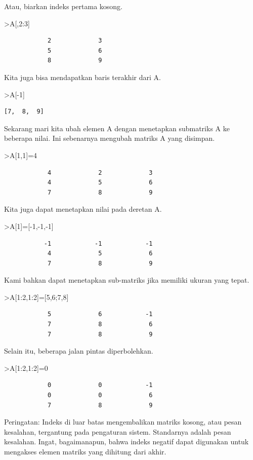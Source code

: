\documentclass[
]{book}
\begin{document}
Atau, biarkan indeks pertama kosong.

\textgreater A{[},2:3{]}

\begin{verbatim}
            2             3 
            5             6 
            8             9 
\end{verbatim}

Kita juga bisa mendapatkan baris terakhir dari A.

\textgreater A{[}-1{]}

\begin{verbatim}
[7,  8,  9]
\end{verbatim}

Sekarang mari kita ubah elemen A dengan menetapkan submatriks A ke beberapa nilai. Ini sebenarnya mengubah matriks A yang disimpan.

\textgreater A{[}1,1{]}=4

\begin{verbatim}
            4             2             3 
            4             5             6 
            7             8             9 
\end{verbatim}

Kita juga dapat menetapkan nilai pada deretan A.

\textgreater A{[}1{]}={[}-1,-1,-1{]}

\begin{verbatim}
           -1            -1            -1 
            4             5             6 
            7             8             9 
\end{verbatim}

Kami bahkan dapat menetapkan sub-matriks jika memiliki ukuran yang tepat.

\textgreater A{[}1:2,1:2{]}={[}5,6;7,8{]}

\begin{verbatim}
            5             6            -1 
            7             8             6 
            7             8             9 
\end{verbatim}

Selain itu, beberapa jalan pintas diperbolehkan.

\textgreater A{[}1:2,1:2{]}=0

\begin{verbatim}
            0             0            -1 
            0             0             6 
            7             8             9 
\end{verbatim}

Peringatan: Indeks di luar batas mengembalikan matriks kosong, atau pesan kesalahan, tergantung pada pengaturan sistem. Standarnya adalah pesan kesalahan. Ingat, bagaimanapun, bahwa indeks negatif dapat digunakan untuk mengakses elemen matriks yang dihitung dari akhir.
\end{document}
